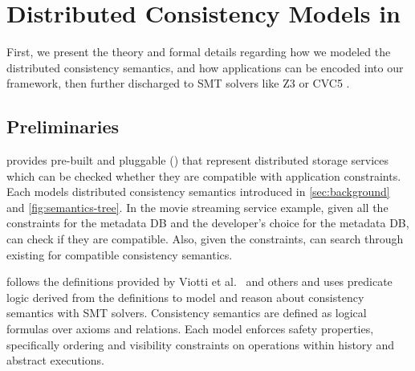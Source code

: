 \section{Distributed Consistency Models in \sysname{}}
\label{sec:design}

First, we present the theory and formal details regarding how we modeled
the distributed consistency semantics, and how applications can be
encoded into our \sysname{} framework, then further discharged to
SMT solvers like Z3 \cite{demoura2008z3} or CVC5 \cite{barbosa2022cvc5}.

\subsection{Preliminaries}

\sysname{} provides pre-built and pluggable \sysmodlongs{} (\sysmods{})
that represent distributed storage services which can be checked whether
they are compatible with application constraints.
Each \sysmod{} models distributed consistency semantics introduced in
\cref{sec:background} and \cref{fig:semantics-tree}.
In the movie streaming service example, given all the constraints for the
metadata DB and the developer's \sysmod{} choice for the metadata DB,
\sysname{} can check if they are compatible. Also, given the constraints,
\sysname{} can search through existing \sysmods{} for compatible
consistency semantics.

\sysname{} follows the definitions provided by
Viotti et al.~\cite{viotti2016consistency} and others
\cite{terry1994session, baldoni2002an, burckhardt2014principles}
and uses predicate logic derived from the definitions to
model \sysmods{} and reason about consistency semantics with SMT solvers.
Consistency semantics are defined as logical formulas over axioms and
relations. Each model enforces safety properties, specifically ordering and
visibility constraints on operations within history and abstract
executions.


